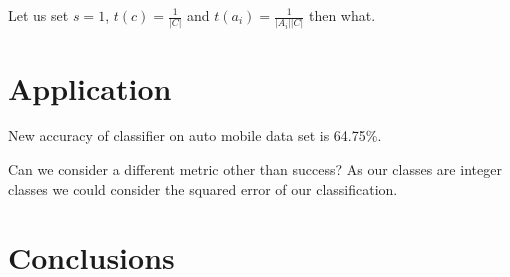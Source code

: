 Let us set $s=1$, $t(c) = \frac{1}{|C|}$ and $t(a_i) = \frac{1}{|A_i||C|}$ then what.

\section{Application}

New accuracy of classifier on auto mobile data set is 64.75\%.

Can we consider a different metric other than success? As our classes are integer classes we could consider the squared error of our classification.

\section{Conclusions}